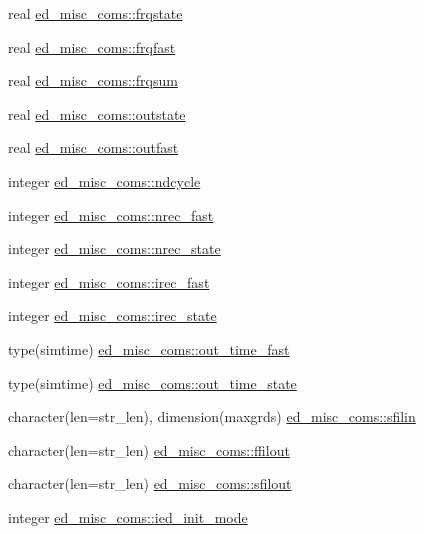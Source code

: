 \begin{DoxyCompactItemize}
\item 
real \hyperlink{namespaceed__misc__coms_a652a6c85394c61d1c898c9c24115df34}{ed\+\_\+misc\+\_\+coms\+::frqstate}
\item 
real \hyperlink{namespaceed__misc__coms_a6e6858a379b23c07604b4cadc2911eb3}{ed\+\_\+misc\+\_\+coms\+::frqfast}
\item 
real \hyperlink{namespaceed__misc__coms_aa14020d7aeaff94be9333b65b7d18523}{ed\+\_\+misc\+\_\+coms\+::frqsum}
\item 
real \hyperlink{namespaceed__misc__coms_ae530849702ef966f40e0afc4f65b1375}{ed\+\_\+misc\+\_\+coms\+::outstate}
\item 
real \hyperlink{namespaceed__misc__coms_ae09f2e8832d84578b31d14be102b09a0}{ed\+\_\+misc\+\_\+coms\+::outfast}
\item 
integer \hyperlink{namespaceed__misc__coms_ae250ef87c34b07475db0c314b6244148}{ed\+\_\+misc\+\_\+coms\+::ndcycle}
\item 
integer \hyperlink{namespaceed__misc__coms_af0a95649338517093c6e6b84fb85d554}{ed\+\_\+misc\+\_\+coms\+::nrec\+\_\+fast}
\item 
integer \hyperlink{namespaceed__misc__coms_a0c4b723dc3751cb2127ac65f3f46e472}{ed\+\_\+misc\+\_\+coms\+::nrec\+\_\+state}
\item 
integer \hyperlink{namespaceed__misc__coms_aebcf01a69f10935f86df08aca7c5df80}{ed\+\_\+misc\+\_\+coms\+::irec\+\_\+fast}
\item 
integer \hyperlink{namespaceed__misc__coms_ae918e21c6b7922bf0aa710e426b9afda}{ed\+\_\+misc\+\_\+coms\+::irec\+\_\+state}
\item 
type(simtime) \hyperlink{namespaceed__misc__coms_a245a1864e1393cbcc92a46204879ecd2}{ed\+\_\+misc\+\_\+coms\+::out\+\_\+time\+\_\+fast}
\item 
type(simtime) \hyperlink{namespaceed__misc__coms_a059beda609f2c3781308158d625e4207}{ed\+\_\+misc\+\_\+coms\+::out\+\_\+time\+\_\+state}
\item 
character(len=str\+\_\+len), dimension(maxgrds) \hyperlink{namespaceed__misc__coms_af344c2e548c776e4b89658593bd13c30}{ed\+\_\+misc\+\_\+coms\+::sfilin}
\item 
character(len=str\+\_\+len) \hyperlink{namespaceed__misc__coms_ac69f1e0ad2683b268d73b442b9d4701e}{ed\+\_\+misc\+\_\+coms\+::ffilout}
\item 
character(len=str\+\_\+len) \hyperlink{namespaceed__misc__coms_a91ddea30ce69d87c8c41200312f5cf89}{ed\+\_\+misc\+\_\+coms\+::sfilout}
\item 
integer \hyperlink{namespaceed__misc__coms_a3fe966618b90f36dbd7502084aa70ea4}{ed\+\_\+misc\+\_\+coms\+::ied\+\_\+init\+\_\+mode}

\end{DoxyCompactItemize}

